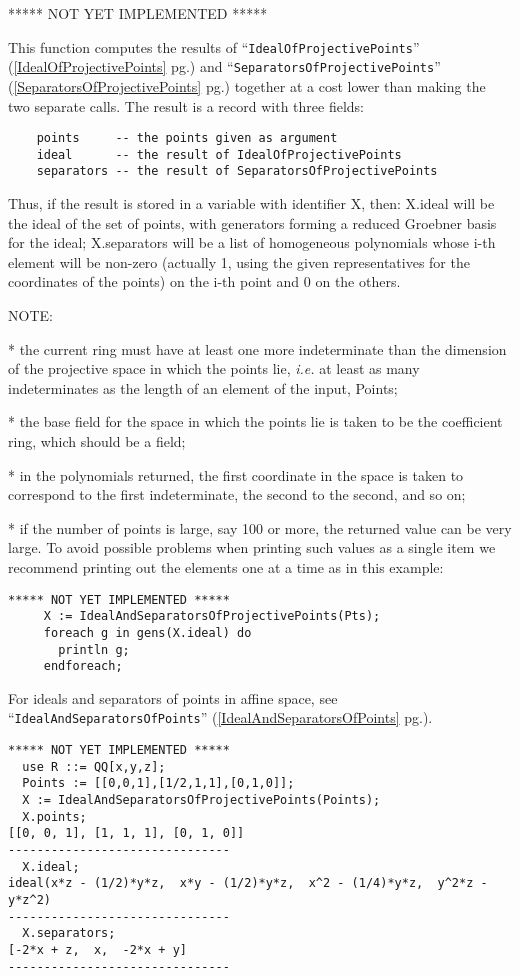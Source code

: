 \documentclass[a4paper]{mybook}
\newenvironment{command}{}{} %
\begin{document}
\begin{command}
***** NOT YET IMPLEMENTED *****
\par 
This function computes the results of ``\verb&IdealOfProjectivePoints&'' (\ref{IdealOfProjectivePoints} pg.\pageref{IdealOfProjectivePoints}) and
``\verb&SeparatorsOfProjectivePoints&'' (\ref{SeparatorsOfProjectivePoints} pg.\pageref{SeparatorsOfProjectivePoints}) together at a cost lower than making
the two separate calls.  The result is a record with three fields:
\begin{verbatim}
    points     -- the points given as argument
    ideal      -- the result of IdealOfProjectivePoints
    separators -- the result of SeparatorsOfProjectivePoints
\end{verbatim}
Thus, if the result is stored in a variable with identifier X, then:
X.ideal will be the ideal of the set of points, with generators
forming a reduced Groebner basis for the ideal;
X.separators will be a list of homogeneous polynomials whose i-th
element will be non-zero (actually 1, using the given representatives
for the coordinates of the points) on the i-th point and 0 on the others.
\par 
NOTE:
\par 
 * the current ring must have at least one more indeterminate than the
   dimension of the projective space in which the points lie, \textit{i.e.} at
   least as many indeterminates as the length of an element of
   the input, Points;
\par 
 * the base field for the space in which the points lie is taken to be
   the coefficient ring, which should be a field;
\par 
 * in the polynomials returned, the first coordinate in the space is
   taken to correspond to the first indeterminate, the second to the
   second, and so on;
\par 
 * if the number of points is large, say 100 or more, the returned
   value can be very large.  To avoid possible problems when printing
   such values as a single item we recommend printing out the elements
   one at a time as in this example:
\begin{verbatim}
***** NOT YET IMPLEMENTED *****
     X := IdealAndSeparatorsOfProjectivePoints(Pts);
     foreach g in gens(X.ideal) do
       println g;
     endforeach;
\end{verbatim}

For ideals and separators of points in affine space, see
``\verb&IdealAndSeparatorsOfPoints&'' (\ref{IdealAndSeparatorsOfPoints} pg.\pageref{IdealAndSeparatorsOfPoints}).
\begin{Verbatim}[label=example, rulecolor=\color{PineGreen}, frame=single]
***** NOT YET IMPLEMENTED *****
  use R ::= QQ[x,y,z];
  Points := [[0,0,1],[1/2,1,1],[0,1,0]];
  X := IdealAndSeparatorsOfProjectivePoints(Points);
  X.points;
[[0, 0, 1], [1, 1, 1], [0, 1, 0]]
-------------------------------
  X.ideal;
ideal(x*z - (1/2)*y*z,  x*y - (1/2)*y*z,  x^2 - (1/4)*y*z,  y^2*z - y*z^2)
-------------------------------
  X.separators;
[-2*x + z,  x,  -2*x + y]
-------------------------------


\end{Verbatim}
\end{command}
\end{document}
